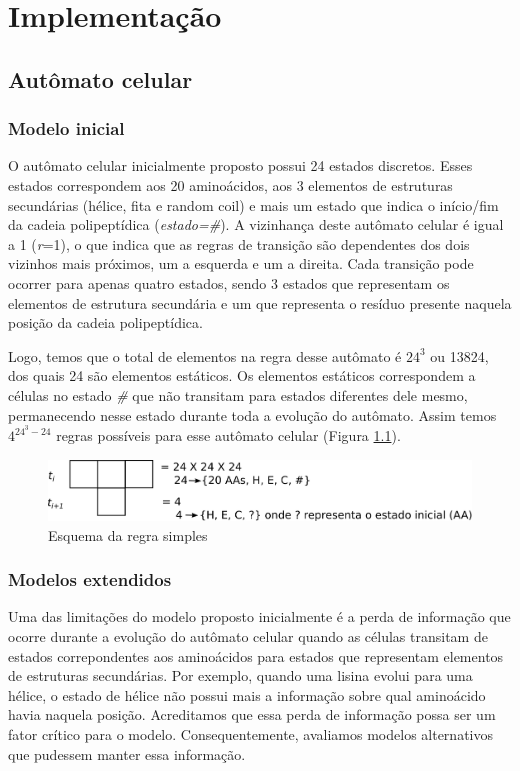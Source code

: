\chapter{Implementação}

\section{Autômato celular}\label{sssec:ca}

\subsection{Modelo inicial}

O autômato celular inicialmente proposto possui 24 estados discretos. Esses estados correspondem aos 20 aminoácidos, aos 3 elementos de estruturas secundárias (hélice, fita e random coil) e mais um estado que indica o início/fim da cadeia polipeptídica (\textit{estado=\#}). A vizinhança deste autômato celular é igual a 1 (\textit{r}=1),  o que indica que as regras de transição são dependentes dos dois vizinhos mais próximos, um a esquerda e um a direita. Cada transição pode ocorrer para apenas quatro estados, sendo 3 estados que representam os elementos de estrutura secundária e um que representa o resíduo presente naquela posição da cadeia polipeptídica.

Logo, temos que o total de elementos na regra desse autômato é $24^3$ ou 13824, dos quais 24 são elementos estáticos. Os elementos estáticos correspondem a células no estado \textit{\#}  que não transitam para estados diferentes dele mesmo, permanecendo nesse estado durante toda a evolução do autômato. Assim temos $4^{24^3-24}$ regras possíveis para esse autômato celular (Figura \ref{fig:ca_rule_scheme}).

\begin{figure}
  \centering
  \includegraphics[width=.8\textwidth]{figures/ca_rule_scheme.pdf}
  \caption{Esquema da regra simples}
        \label{fig:ca_rule_scheme}
\end{figure}

\subsection{Modelos extendidos}

Uma das limitações do modelo proposto inicialmente é a perda de informação que ocorre durante a evolução do autômato celular quando as células transitam de estados correpondentes aos aminoácidos para estados que representam elementos de estruturas secundárias. Por exemplo, quando uma lisina evolui para uma hélice, o estado de hélice não possui mais a informação sobre qual aminoácido havia naquela posição. Acreditamos que essa perda de informação possa ser um fator crítico para o modelo. Consequentemente, avaliamos modelos alternativos que pudessem manter essa informação. 

